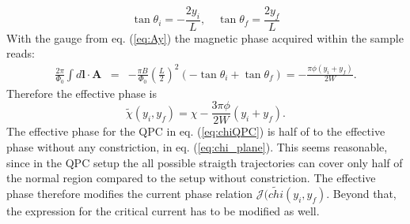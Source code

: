 \begin{equation}
\tan \theta_i = - \frac{2 y_i}{L}, \quad \tan \theta_f = \frac{2 y_f}{L}
\end{equation}
With the gauge from eq. (\ref{eq:Ay}) the magnetic phase acquired within the sample reads:
\begin{eqnarray}
\frac{2\pi}{\Phi_0} \int d\mathbf{l} \cdot \mathbf{A}  &=&
-\frac{\pi B}{\Phi_0}\left(\frac{L}{2}\right)^2
\left(-\tan\theta_i + \tan\theta_f\right) =
-\frac{\pi \phi (y_i+y_f)}{2 W}.
\label{eq:phaseQPC}
\end{eqnarray}
Therefore the effective phase is
\begin{equation}
\tilde{\chi}(y_i,y_f)=\chi-\frac{3\pi \phi }{2W}(y_i+y_f).
\label{eq:chiQPC}
\end{equation}
The effective phase for the QPC in eq. (\ref{eq:chiQPC}) is half of to the effective phase without any constriction, in eq. (\ref{eq:chi_plane}). This seems reasonable, since in the QPC setup the all possible straigth trajectories can cover only half of the normal region compared to the setup without constriction.
The effective phase therefore modifies the current phase relation $\mathcal{J}(\tilde{chi}(y_i, y_f)$. Beyond that, the expression for the critical current has to be modified as well.

